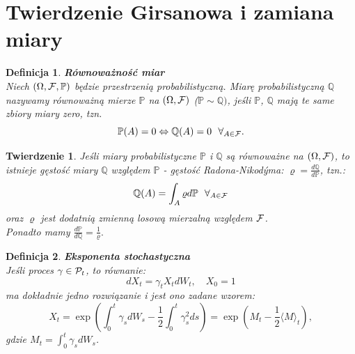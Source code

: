 \documentclass{mini}
\theoremstyle{mythstyle}
\newtheorem{Twierdzenie}{Twierdzenie}[chapter]
\newtheorem{Definicja}{Definicja}[chapter]
\begin{document}
\section{Twierdzenie Girsanowa i zamiana miary}
\begin{Definicja}\textbf{Równoważność miar}\\
	Niech $(\Omega, {\cal F}, \mathbb{P})$ będzie przestrzenią
	probabilistyczną. Miarę probabilistyczną $\mathbb{Q}$ nazywamy
	równoważną mierze $\mathbb{P}$ na $(\Omega, {\cal F})$ ($\mathbb{P} \sim \mathbb{Q})$, jeśli $\mathbb{P}$, $\mathbb{Q}$ mają
	te same zbiory miary zero, tzn.
	\begin{equation*}
	\mathbb{P}(A) = 0 \Leftrightarrow \mathbb{Q}(A) = 0\   \	\forall_{A \in {\cal F}}.\\
	\end{equation*}
\end{Definicja}
\begin{Twierdzenie}
	Jeśli miary probabilistyczne $\mathbb{P}$ i $\mathbb{Q}$ są
	równoważne na $(\Omega, {\cal F})$, to istnieje gęstość miary $\mathbb{Q}$
	względem $\mathbb{P}$ - gęstość Radona-Nikod\'{y}ma: $\varrho = \frac{d
		\mathbb{Q}}{d \mathbb{P}}$, tzn.:
	\begin{equation*}
	\mathbb{Q}(A) = \int_A \varrho d
	\mathbb{P}\   \	\forall_{A \in {\cal F}}
	\end{equation*}
	oraz $\varrho$ jest dodatnią zmienną losową mierzalną względem ${\cal F}$.\\ Ponadto mamy
	$\frac{d \mathbb{P}}{d \mathbb{Q}} = \frac{1}{\varrho}.$\\
\end{Twierdzenie}
\begin{Definicja}\textbf{Eksponenta stochastyczna}\\
	Jeśli proces $\gamma \in {\cal P}_t$, to równanie:
	\begin{equation}
	dX_t = \gamma_t X_t dW_t,\quad X_0 = 1
	\end{equation}
	ma dokładnie jedno rozwiązanie i jest ono zadane wzorem:
	\begin{equation} \label{Dolean}
	X_t = \exp \left( \int_0^t \gamma_s dW_s - \frac{1}{2} \int_0^t
	\gamma_s^2 ds\right) = \exp \left(M_t - \frac{1}{2} \langle M \rangle_t \right),
	\end{equation} gdzie $M_t=\int_0^t \gamma_sdW_s$. \\
\end{Definicja}
\end{document}
